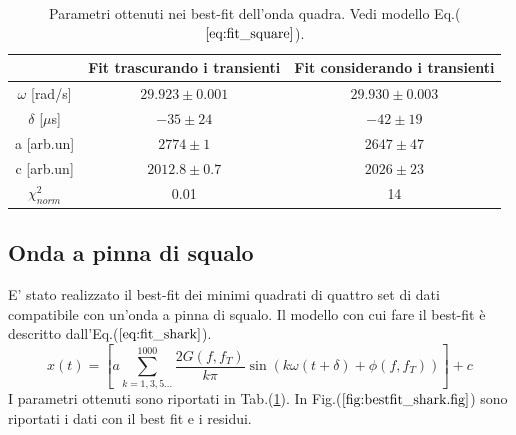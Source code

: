 \documentclass{article}
\begin{document}
            \begin{table}[H]
                \centering
                \begin{tabular}{ccc}
                    \hline
                     & Fit trascurando i transienti & Fit considerando i transienti \\
                    \hline
                    $\omega$ [rad/s]        & $29.923 \pm 0.001$    & $29.930\pm 0.003$ \\
                    $\delta$ [$\mu$s]       & $-35\pm 24$           & $-42\pm 19$ \\
                    a [arb.un]              & $2774 \pm 1$          & $2647 \pm 47$ \\
                    c [arb.un]              & $2012.8 \pm 0.7$      & $2026 \pm 23$ \\
                    $\chi^{2}_{norm}$ & 0.01 & 14 \\
                    \hline
                \end{tabular}
                \caption{Parametri ottenuti nei best-fit dell'onda quadra. 
                Vedi modello Eq.($\ref{eq:fit_square}$).}
                \label{tab:bestfit_square}
            \end{table}

            

            
    \subsection{Onda a pinna di squalo}
        E' stato realizzato il best-fit dei minimi quadrati
        di quattro set di dati compatibile con un'onda a pinna di squalo.
        Il modello con cui fare il best-fit è descritto dall'Eq.($\ref{eq:fit_shark}$).
                \begin{equation}
                    x(t) = \left[a\sum_{k=1,3,5...}^{1000} \frac{2G(f,f_T)}{k\pi}\sin\left(k\omega (t+\delta)+\phi(f,f_T)\right)\right] +c
                    \label{eq:fit_shark}
                \end{equation} 
        I parametri ottenuti sono riportati in Tab.(\ref{tab:bestfit_square}).%
        In Fig.($\ref{fig:bestfit_shark.fig}$) sono riportati i dati con il best fit e 
        i residui.
\end{document}
